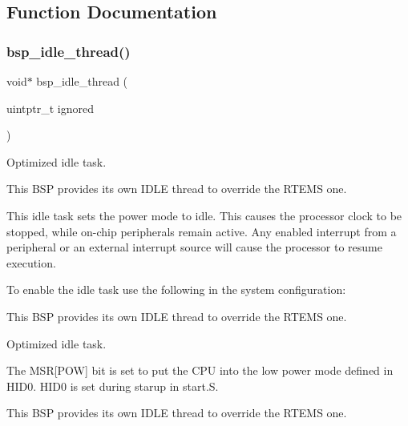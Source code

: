 \subsection{Function Documentation}
\mbox{\label{group__RTEMSBSPsSPARCLEON2_ga301be7085b80c41a9c5887247003c662}} 
\subsubsection{\texorpdfstring{bsp\_idle\_thread()}{bsp\_idle\_thread()}}
{\footnotesize\ttfamily void$\ast$ bsp\+\_\+idle\+\_\+thread (\begin{DoxyParamCaption}\item[{uintptr\+\_\+t}]{ignored }\end{DoxyParamCaption})}



Optimized idle task. 

This B\+SP provides its own I\+D\+LE thread to override the R\+T\+E\+MS one.

This idle task sets the power mode to idle. This causes the processor clock to be stopped, while on-\/chip peripherals remain active. Any enabled interrupt from a peripheral or an external interrupt source will cause the processor to resume execution.

To enable the idle task use the following in the system configuration\+:


\begin{DoxyCode}{0}
\DoxyCodeLine{\textcolor{preprocessor}{\#include <bsp.h>}}
\DoxyCodeLine{}
\DoxyCodeLine{\textcolor{preprocessor}{\#define CONFIGURE\_INIT}}
\DoxyCodeLine{}
\DoxyCodeLine{\textcolor{preprocessor}{\#define CONFIGURE\_IDLE\_TASK\_BODY bsp\_idle\_thread}}
\DoxyCodeLine{}
\end{DoxyCode}


This B\+SP provides its own I\+D\+LE thread to override the R\+T\+E\+MS one.

Optimized idle task.

The M\+SR\mbox{[}P\+OW\mbox{]} bit is set to put the C\+PU into the low power mode defined in H\+I\+D0. H\+I\+D0 is set during starup in start.\+S.

This B\+SP provides its own I\+D\+LE thread to override the R\+T\+E\+MS one.

